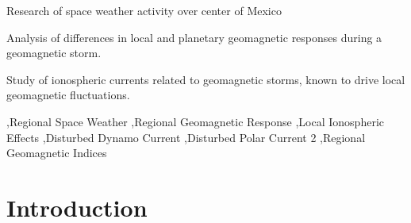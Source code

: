 \documentclass[a4paper,fleqn]{cas-dc}
\begin{document}
\begin{highlights} 
\item Research of space weather activity over center of Mexico

\item Analysis of differences in local and planetary geomagnetic responses during a geomagnetic storm. 
\item Study of ionospheric currents related to geomagnetic storms, known to drive local geomagnetic fluctuations. 
\end{highlights}

\begin{keywords}
 \sep Regional Space Weather \sep Regional Geomagnetic Response \sep Local Ionospheric Effects \sep Disturbed Dynamo Current \sep Disturbed Polar Current 2 \sep Regional Geomagnetic Indices
\end{keywords}

\maketitle
\section{Introduction}
     \label{S-Introduction} 

\end{document}
